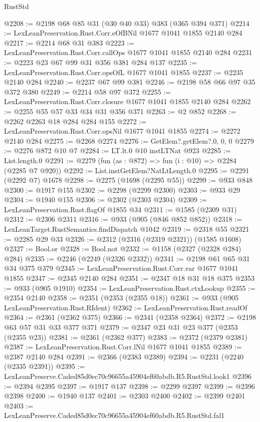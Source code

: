 \begin{lexlean}{RustStd}
\begin{coremodule}
@2208 := @2198 @68 @85 @31 (@30 @40 @33) @383 (@365 @394 @371)
@2214 := LexLeanPreservation.Rust.Corr.eOfBNil @1677 @1041 @1855 @2140 @284
@2217 := @2214 @68 @31 @383
@2223 := LexLeanPreservation.Rust.Corr.callOps @1677 @1041 @1855 @2140 @284
@2231 := @2223 @23 @67 @99 @31 @356 @381 @284 @137
@2235 := LexLeanPreservation.Rust.Corr.opsOfL @1677 @1041 @1855
@2237 := @2235 @2140 @284
@2240 := @2237 @67 @99 @381
@2246 := @2198 @58 @66 @97 @35 @372 @380
@2249 := @2214 @58 @97 @372
@2255 := LexLeanPreservation.Rust.Corr.closure @1677 @1041 @1855 @2140 @284
@2262 := @2255 @55 @57 @33 @34 @31 @356 @371
@2263 := @2 @852
@2268 := @2262 @2263 @18 @284 @284 @155
@2272 := LexLeanPreservation.Rust.Corr.opsNil @1677 @1041 @1855
@2274 := @2272 @2140 @284
@2275 := @2268 @2274
@2276 := GetElem?.getElem?.{0, 0, 0}
@2279 := @2276 @872 @10 @7
@2284 := LT.lt.{0} @10 instLTNat @923
@2285 := List.length.{0}
@2291 := @2279 (fun (as : @872) => fun (i : @10) => @2284 (@2285 @7 @920))
@2292 := List.instGetElem?NatLtLength.{0}
@2295 := @2291 (@2292 @7) @1678
@2298 := @2275 (@1698 (@2295 @55))
@2299 := @933 @848
@2300 := @1917 @155
@2302 := @2298 (@2299 @2300)
@2303 := @933 @29
@2304 := @1940 @155
@2306 := @2302 (@2303 @2304)
@2309 := LexLeanPreservation.Rust.flagOf @1855 @34
@2311 := @1585 (@2309 @31)
@2312 := @2306 @2311
@2316 := @933 (@905 (@846 @852 @852))
@2318 := LexLeanTarget.RustSemantics.findDispatch @1042
@2319 := @2318 @55
@2321 := @2285 @29 @33
@2326 := @2312 (@2316 (@2319 @2321)) (@1585 @1608)
@2327 := Bool.or
@2328 := Bool.not
@2332 := @1158 (@2327 (@2328 @284) @284)
@2335 := @2246 (@2249 (@2326 @2332))
@2341 := @2198 @61 @65 @31 @34 @375 @379
@2345 := LexLeanPreservation.Rust.Corr.var @1677 @1041 @1855
@2347 := @2345 @2140 @284
@2351 := @2347 @18 @31 @18 @375
@2353 := @933 (@905 @1910)
@2354 := LexLeanPreservation.Rust.ctxLookup
@2355 := @2354 @2140
@2358 := @2351 (@2353 (@2355 @18))
@2361 := @933 (@905 LexLeanPreservation.Rust.RIdent)
@2362 := LexLeanPreservation.Rust.readOf
@2364 := @2361 (@2362 @375)
@2366 := @2341 (@2358 @2364)
@2372 := @2198 @63 @57 @31 @33 @377 @371
@2379 := @2347 @23 @31 @23 @377 (@2353 (@2355 @23))
@2381 := @2361 (@2362 @377)
@2383 := @2372 (@2379 @2381)
@2387 := LexLeanPreservation.Rust.Corr.lNil @1677 @1041 @1855
@2389 := @2387 @2140 @284
@2391 := @2366 (@2383 @2389)
@2394 := @2231 (@2240 (@2335 @2391))
@2395 := LexLeanPreserve.Caded85d0ec70c96655a45904ef60abdb.R5.RustStd.look1
@2396 := @2394 @2395
@2397 := @1917 @137
@2398 := @2299 @2397
@2399 := @2396 @2398
@2400 := @1940 @137
@2401 := @2303 @2400
@2402 := @2399 @2401
@2403 := LexLeanPreserve.Caded85d0ec70c96655a45904ef60abdb.R5.RustStd.fal1

\end{coremodule}
\end{lexlean}
